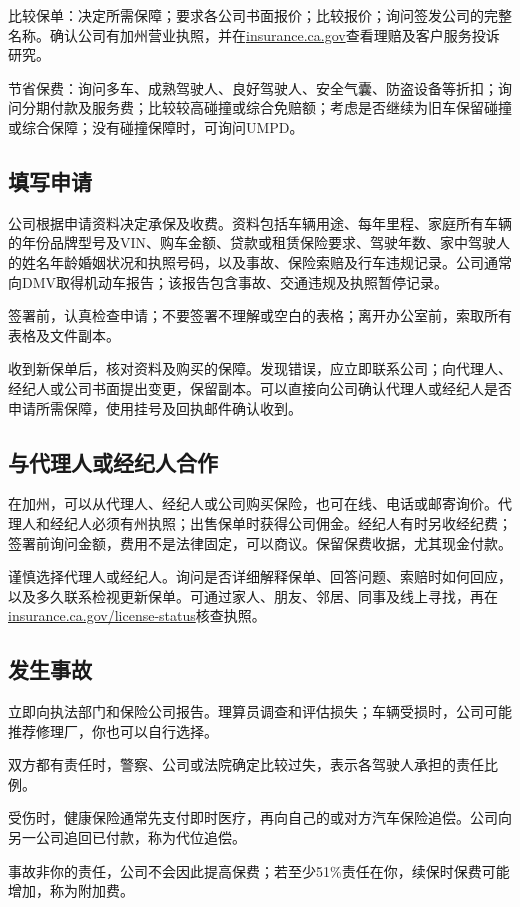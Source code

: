 \documentclass[UTF8,fontset=none,11pt,a4paper]{ctexart}
\begin{document}
比较保单：决定所需保障；要求各公司书面报价；比较报价；询问签发公司的完整名称。确认公司有加州营业执照，并在\url{insurance.ca.gov}查看理赔及客户服务投诉研究。


节省保费：询问多车、成熟驾驶人、良好驾驶人、安全气囊、防盗设备等折扣；询问分期付款及服务费；比较较高碰撞或综合免赔额；考虑是否继续为旧车保留碰撞或综合保障；没有碰撞保障时，可询问UMPD。


\subsection*{填写申请}
公司根据申请资料决定承保及收费。资料包括车辆用途、每年里程、家庭所有车辆的年份品牌型号及VIN、购车金额、贷款或租赁保险要求、驾驶年数、家中驾驶人的姓名年龄婚姻状况和执照号码，以及事故、保险索赔及行车违规记录。公司通常向DMV取得机动车报告；该报告包含事故、交通违规及执照暂停记录。


签署前，认真检查申请；不要签署不理解或空白的表格；离开办公室前，索取所有表格及文件副本。


收到新保单后，核对资料及购买的保障。发现错误，应立即联系公司；向代理人、经纪人或公司书面提出变更，保留副本。可以直接向公司确认代理人或经纪人是否申请所需保障，使用挂号及回执邮件确认收到。


\subsection*{与代理人或经纪人合作}
在加州，可以从代理人、经纪人或公司购买保险，也可在线、电话或邮寄询价。代理人和经纪人必须有州执照；出售保单时获得公司佣金。经纪人有时另收经纪费；签署前询问金额，费用不是法律固定，可以商议。保留保费收据，尤其现金付款。


谨慎选择代理人或经纪人。询问是否详细解释保单、回答问题、索赔时如何回应，以及多久联系检视更新保单。可通过家人、朋友、邻居、同事及线上寻找，再在\url{insurance.ca.gov/license-status}核查执照。


\subsection*{发生事故}
立即向执法部门和保险公司报告。理算员调查和评估损失；车辆受损时，公司可能推荐修理厂，你也可以自行选择。


双方都有责任时，警察、公司或法院确定比较过失，表示各驾驶人承担的责任比例。


受伤时，健康保险通常先支付即时医疗，再向自己的或对方汽车保险追偿。公司向另一公司追回已付款，称为代位追偿。


事故非你的责任，公司不会因此提高保费；若至少51\%责任在你，续保时保费可能增加，称为附加费。
\end{document}
